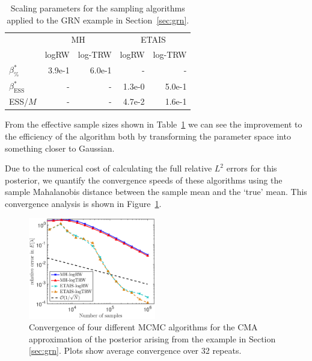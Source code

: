\documentclass[final]{siamltex}
\newcommand{\edit}[1]{#1}
\begin{document}
\begin{table}[!h]
	\centering
	\begin{tabular}{lrrrr}
	\toprule
		 & \multicolumn{2}{c}{MH} & \multicolumn{2}{c}{ETAIS} \\ \cmidrule(lr){2-3} \cmidrule(lr){4-5}
		& logRW & log-TRW & logRW & log-TRW \\ \midrule
		$\beta_{\%}^*$	 	& 3.9e-1 &6.0e-1 & - & - \\
		$\beta_{\text{ESS}}^*$	       & -            & -          & 1.3e-0 & 5.0e-1 \\
		ESS/$M$		 	 & -            & -            & 4.7e-2 & 1.6e-1  \\
	\bottomrule
	\end{tabular}
	\caption{Scaling parameters for the sampling algorithms applied to the GRN example in Section~\ref{sec:grn}.}
	\label{tab:grn_scaling_parameters}
\end{table}

From the effective sample sizes shown in
Table~\ref{tab:grn_scaling_parameters} we can see the improvement to
the efficiency of the algorithm both by transforming the parameter
space into something closer to Gaussian.

Due to the numerical cost of calculating the full relative $L^2$ errors for this posterior, we quantify the convergence speeds of these algorithms using the sample Mahalanobis distance between the sample mean and the `true' mean. This convergence analysis is shown in Figure~\ref{fig:grn_L2}.

\begin{figure}[!htb]
\centering
\includegraphics[width=0.495\textwidth]{"images/GRN_convergence_log"}
\caption{Convergence of four different MCMC algorithms for the CMA
  approximation of the  posterior arising from the example in Section
  \ref{sec:grn}. \edit{Plots show average
    convergence over 32 repeats.}}
\label{fig:grn_L2}
\end{figure}
\end{document}
